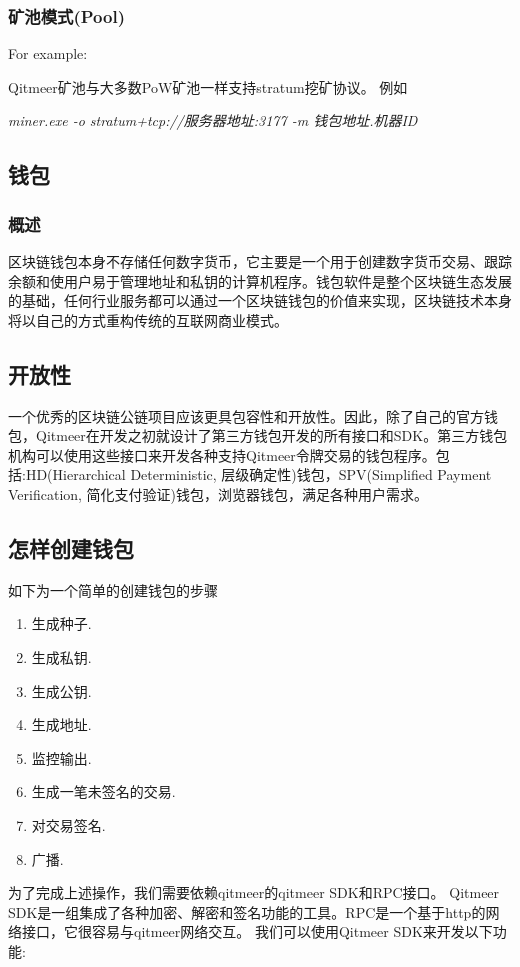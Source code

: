 \documentclass[a4paper,11pt]{article}
\begin{document}
\subsubsection*{矿池模式(Pool)}
For example:

Qitmeer矿池与大多数PoW矿池一样支持stratum挖矿协议。
例如

\emph{miner.exe -o stratum+tcp://服务器地址:3177 -m 钱包地址.机器ID}

\subsection{钱包}
\subsubsection{概述}
   区块链钱包本身不存储任何数字货币，它主要是一个用于创建数字货币交易、跟踪余额和使用户易于管理地址和私钥的计算机程序。钱包软件是整个区块链生态发展的基础，任何行业服务都可以通过一个区块链钱包的价值来实现，区块链技术本身将以自己的方式重构传统的互联网商业模式。

\subsection*{开放性}
   一个优秀的区块链公链项目应该更具包容性和开放性。因此，除了自己的官方钱包，Qitmeer在开发之初就设计了第三方钱包开发的所有接口和SDK。第三方钱包机构可以使用这些接口来开发各种支持Qitmeer令牌交易的钱包程序。包括:HD(Hierarchical Deterministic, 层级确定性)钱包，SPV(Simplified Payment Verification, 简化支付验证)钱包，浏览器钱包，满足各种用户需求。
\subsection*{怎样创建钱包}
   如下为一个简单的创建钱包的步骤
\begin{enumerate}
	\item  生成种子.
    \item  生成私钥.
    \item  生成公钥.
    \item  生成地址.
    \item  监控输出.
    \item  生成一笔未签名的交易.
    \item  对交易签名.
    \item  广播.
\end{enumerate}

   为了完成上述操作，我们需要依赖qitmeer的qitmeer SDK和RPC接口。
Qitmeer SDK是一组集成了各种加密、解密和签名功能的工具。RPC是一个基于http的网络接口，它很容易与qitmeer网络交互。
我们可以使用Qitmeer SDK来开发以下功能:
\end{document}
